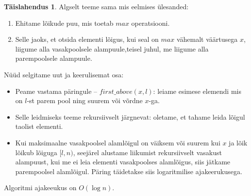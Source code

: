 \documentclass{trkut}
\theoremstyle{definition}
\newtheorem*{solution}{Täislahendus}
\begin{document}
\begin{solution}
Algselt teeme sama mis eelmises ülesanded: 
\begin{enumerate}
\item Ehitame lõikude puu, mis toetab $max$ operatsiooni.
\item Selle jaoks, et otsida elementi lõigus, kui seal on $max$ vähemalt väärtusega $x$, liigume alla vasakpoolsele alampuule,teisel juhul, me liigume alla parempoolsele alampuule.
\end{enumerate}


Nüüd selgitame uut ja keerulisemat osa:
\begin{itemize}
\item Peame vastama päringule -- $first\_above(x,l)$: leiame esimese elemendi mis on $l$-st parem pool ning suurem või võrdne $x$-ga.
\item Selle leidmiseks teeme rekursiivselt järgnevat: oletame, et tahame leida lõigul taolist elementi. 
\item Kui maksimaalne vasakpoolsel alamlõigul on väiksem või suurem kui $x$ ja lõik lõikub lõiguga $[l,n)$, seejärel alustame liikumist rekursiivselt vasakust alampuust, kui me ei leia elementi vasakpoolses alamlõigus, siis jätkame parempoolsel alamlõigul. Päring täidetakse siis logaritmilise ajakeerukusega. 
\end{itemize}
Algoritmi ajakeeukus on $O(\log n)$.
\end{solution}
\end{document}
